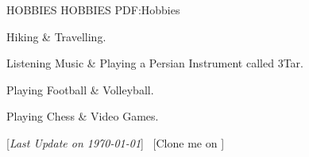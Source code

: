\documentclass[letterpaper,MMMyyyy,nonstopmode]{resume}
\newcommand{\CVNote}{Last Update on \today}
\begin{document}
\begin{Body}

\Section
{HOBBIES}
{HOBBIES}
{PDF:Hobbies}

\BulletItem
Hiking \& Travelling.

\Gap
\BulletItem
Listening Music \& Playing a Persian Instrument called 3Tar.

\Gap
\BulletItem
Playing Football \& Volleyball.

\Gap
\BulletItem
Playing Chess \& Video Games.


{\UseNoteFont
\hfill
[\textit{\CVNote}]
\SubBulletSymbol\,
[Clone me on
\href{https://github.com/aliyazdi75/Resume}
{\faGithub}]}

\end{Body}
\end{document}
